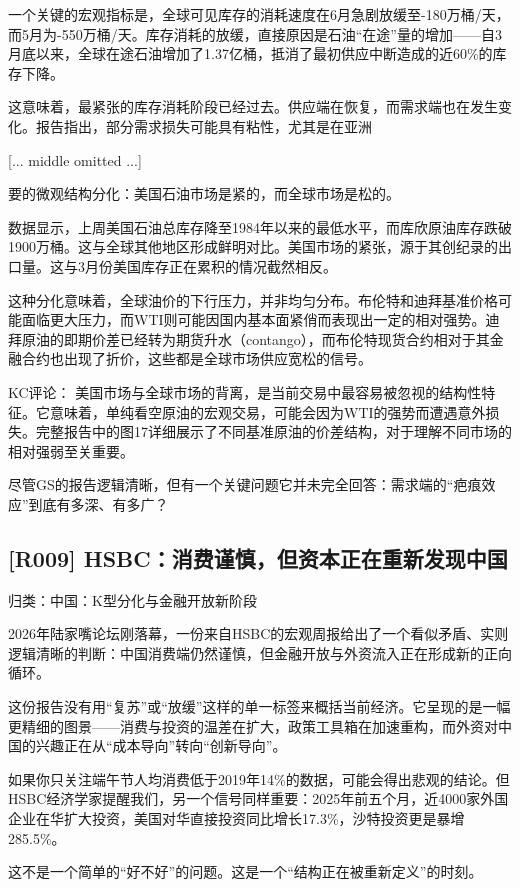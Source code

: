 \documentclass[11pt]{ctexart}
\begin{document}
一个关键的宏观指标是，全球可见库存的消耗速度在6月急剧放缓至-180万桶/天，而5月为-550万桶/天。库存消耗的放缓，直接原因是石油“在途”量的增加——自3月底以来，全球在途石油增加了1.37亿桶，抵消了最初供应中断造成的近60\%的库存下降。

这意味着，最紧张的库存消耗阶段已经过去。供应端在恢复，而需求端也在发生变化。报告指出，部分需求损失可能具有粘性，尤其是在亚洲

[... middle omitted ...]

要的微观结构分化：美国石油市场是紧的，而全球市场是松的。

数据显示，上周美国石油总库存降至1984年以来的最低水平，而库欣原油库存跌破1900万桶。这与全球其他地区形成鲜明对比。美国市场的紧张，源于其创纪录的出口量。这与3月份美国库存正在累积的情况截然相反。

这种分化意味着，全球油价的下行压力，并非均匀分布。布伦特和迪拜基准价格可能面临更大压力，而WTI则可能因国内基本面紧俏而表现出一定的相对强势。迪拜原油的即期价差已经转为期货升水（contango），而布伦特现货合约相对于其金融合约也出现了折价，这些都是全球市场供应宽松的信号。

KC评论： 美国市场与全球市场的背离，是当前交易中最容易被忽视的结构性特征。它意味着，单纯看空原油的宏观交易，可能会因为WTI的强势而遭遇意外损失。完整报告中的图17详细展示了不同基准原油的价差结构，对于理解不同市场的相对强弱至关重要。

尽管GS的报告逻辑清晰，但有一个关键问题它并未完全回答：需求端的“疤痕效应”到底有多深、有多广？

\subsection{[R009] HSBC：消费谨慎，但资本正在重新发现中国}
{\small\color{refgray}归类：中国：K型分化与金融开放新阶段}

2026年陆家嘴论坛刚落幕，一份来自HSBC的宏观周报给出了一个看似矛盾、实则逻辑清晰的判断：中国消费端仍然谨慎，但金融开放与外资流入正在形成新的正向循环。

这份报告没有用“复苏”或“放缓”这样的单一标签来概括当前经济。它呈现的是一幅更精细的图景——消费与投资的温差在扩大，政策工具箱在加速重构，而外资对中国的兴趣正在从“成本导向”转向“创新导向”。

如果你只关注端午节人均消费低于2019年14\%的数据，可能会得出悲观的结论。但HSBC经济学家提醒我们，另一个信号同样重要：2025年前五个月，近4000家外国企业在华扩大投资，美国对华直接投资同比增长17.3\%，沙特投资更是暴增285.5\%。

这不是一个简单的“好不好”的问题。这是一个“结构正在被重新定义”的时刻。
\end{document}
